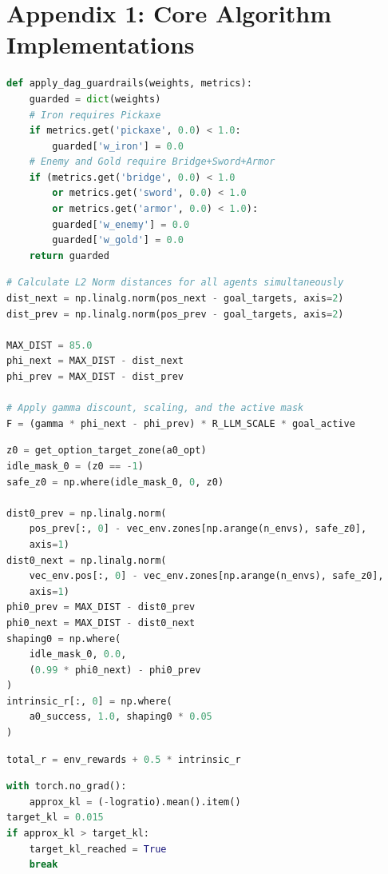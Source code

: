 \newpage
\section*{Appendix 1: Core Algorithm Implementations}

\begin{lstlisting}[style=code, language=Python, caption={DAG guardrail enforcement in \texttt{orchestrator.py}.}, label={lst:dag_guardrail}]
def apply_dag_guardrails(weights, metrics):
    guarded = dict(weights)
    # Iron requires Pickaxe
    if metrics.get('pickaxe', 0.0) < 1.0:
        guarded['w_iron'] = 0.0
    # Enemy and Gold require Bridge+Sword+Armor
    if (metrics.get('bridge', 0.0) < 1.0
        or metrics.get('sword', 0.0) < 1.0
        or metrics.get('armor', 0.0) < 1.0):
        guarded['w_enemy'] = 0.0
        guarded['w_gold'] = 0.0
    return guarded
\end{lstlisting}

\begin{lstlisting}[style=code, language=Python, caption={Vectorised PBRS computation across all environments in \texttt{orchestrator.py}.}, label={lst:pbrs_code}]
# Calculate L2 Norm distances for all agents simultaneously
dist_next = np.linalg.norm(pos_next - goal_targets, axis=2)
dist_prev = np.linalg.norm(pos_prev - goal_targets, axis=2)

MAX_DIST = 85.0
phi_next = MAX_DIST - dist_next
phi_prev = MAX_DIST - dist_prev

# Apply gamma discount, scaling, and the active mask
F = (gamma * phi_next - phi_prev) * R_LLM_SCALE * goal_active
\end{lstlisting}

\begin{lstlisting}[style=code, language=Python, caption={Per-agent intrinsic shaping in \texttt{hrl\_train\_loop.py}.}, label={lst:hrl_intrinsic}]
z0 = get_option_target_zone(a0_opt)
idle_mask_0 = (z0 == -1)
safe_z0 = np.where(idle_mask_0, 0, z0)

dist0_prev = np.linalg.norm(
    pos_prev[:, 0] - vec_env.zones[np.arange(n_envs), safe_z0],
    axis=1)
dist0_next = np.linalg.norm(
    vec_env.pos[:, 0] - vec_env.zones[np.arange(n_envs), safe_z0],
    axis=1)
phi0_prev = MAX_DIST - dist0_prev
phi0_next = MAX_DIST - dist0_next
shaping0 = np.where(
    idle_mask_0, 0.0,
    (0.99 * phi0_next) - phi0_prev
)
intrinsic_r[:, 0] = np.where(
    a0_success, 1.0, shaping0 * 0.05
)
\end{lstlisting}

\begin{lstlisting}[style=code, language=Python, caption={Composite reward in \texttt{hrl\_train\_loop.py}.}, label={lst:composite_reward}]
total_r = env_rewards + 0.5 * intrinsic_r
\end{lstlisting}

\begin{lstlisting}[style=code, language=Python, caption={Target KL guard in \texttt{hrl\_train\_loop.py}.}, label={lst:target_kl}]
with torch.no_grad():
    approx_kl = (-logratio).mean().item()
target_kl = 0.015
if approx_kl > target_kl:
    target_kl_reached = True
    break
\end{lstlisting}
